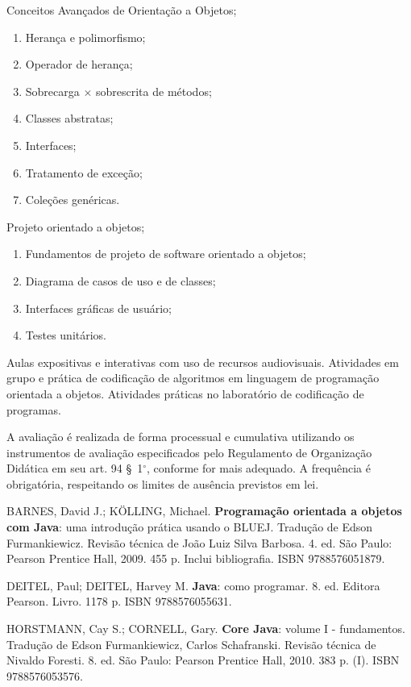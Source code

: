 \begin{pud}
\begin{description}[itemsep=0em]
         \item[UNIDADE III:] Conceitos Avançados de Orientação a Objetos;
	         \begin{enumerate}[itemsep=0em, topsep=0em]
				\item Herança e polimorfismo;
				\item Operador de herança;
				\item Sobrecarga $\times$ sobrescrita de métodos;
				\item Classes abstratas;
				\item Interfaces;
				\item Tratamento de exceção;
				\item Coleções genéricas.      
            \end{enumerate}
            
         \item[UNIDADE IV:]  Projeto orientado a objetos;
	         \begin{enumerate}[itemsep=0em, topsep=0em]
				\item Fundamentos de projeto de software orientado a objetos;
				\item Diagrama de casos de uso e de classes;
				\item Interfaces gráficas de usuário;
				\item Testes unitários.
            \end{enumerate}
	\end{description}	
	
	\metodologia
	Aulas expositivas e interativas com uso de recursos audiovisuais.  Atividades em grupo e prática de codificação de algoritmos em linguagem de programação orientada a objetos. Atividades práticas no laboratório de codificação de programas.
	
	\avaliacao
	A avaliação é realizada de forma processual e cumulativa utilizando os instrumentos de avaliação especificados pelo Regulamento de Organização Didática em seu art. 94 \S~1$^\circ$, conforme for mais adequado. A frequência é obrigatória, respeitando os limites de ausência previstos em lei.
	\naopresencial
	

	\begin{bibbasica}
		\item BARNES, David J.; KÖLLING, Michael. \textbf{Programação orientada a objetos com Java}: uma introdução prática usando o BLUEJ. Tradução de Edson Furmankiewicz. Revisão técnica de João Luiz Silva Barbosa. 4. ed. São Paulo: Pearson Prentice Hall, 2009. 455 p. Inclui bibliografia. ISBN 9788576051879. 
		\item DEITEL, Paul; DEITEL, Harvey M. \textbf{Java}: como programar. 8. ed. Editora Pearson. Livro. 1178 p. ISBN 9788576055631.  
		\item HORSTMANN, Cay S.; CORNELL, Gary. \textbf{Core Java}: volume I - fundamentos. Tradução de Edson Furmankiewicz, Carlos Schafranski. Revisão técnica de Nivaldo Foresti. 8. ed. São Paulo: Pearson Prentice Hall, 2010. 383 p. (I). ISBN 9788576053576.
		

\end{bibbasica}
\end{pud}
